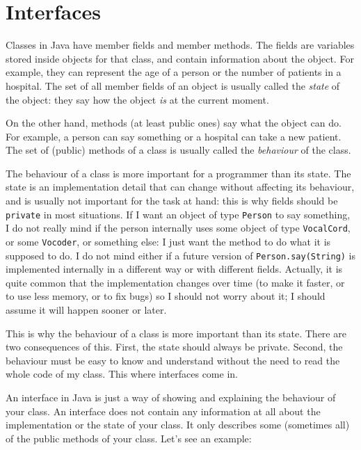 %    

\section{Interfaces}
\label{sec:interfaces}

Classes in Java have member fields and member methods. The fields are
variables stored inside objects for that class, and contain
information about the object. For example, they can represent the age
of a person or the number of patients in a hospital. The set of all
member fields of an object is usually called the \emph{state} of the
object: they say how the object \emph{is} at the current moment. 

On the other hand, methods (at least public ones) say what the object
can do. For example, a person can say something or a hospital can take
a new patient. The set of (public) methods of a class is usually
called the \emph{behaviour} of the class. 

The behaviour of a class is more important for a programmer than its
state. The state is an implementation detail that can change without
affecting its behaviour, and is usually not important for the task at
hand: this is why fields should be \verb+private+ in most
situations. If I want an object of type \verb+Person+ to say
something, I do not really mind if the person internally uses some
object of type \verb+VocalCord+, or some \verb+Vocoder+, or something
else: I just want the method to do what it is supposed to do. I do not
mind either if a future version of \verb+Person.say(String)+ is
implemented internally in a different way or with different
fields. Actually, it is quite common that the implementation changes
over time (to make it faster, or to use less memory, or to fix bugs)
so I should not worry about it; I should assume it will happen sooner
or later. 

This is why the behaviour of a class is more important than its
state. There are two consequences of this. First, the state should
always be private. Second, the behaviour must be easy to know and
understand without the need to read the whole code of my class. This
where interfaces come in. 

An interface in Java is just a way of showing and explaining the
behaviour of your class. An interface does not contain any information
at all about the implementation or the state of your class. It only
describes some (sometimes all) of the public methods of your
class. Let's see an example: 

